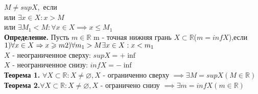 \documentclass[../main.tex]{subfiles}
\begin{document}
$M\neq supX,$ если\\ 
или $\exists x\in X: x> M$\\
или $\exists M_1 <M:\forall x \in X\implies x\leqslant M_1$\\
\textbf{\textbf{Определение.}} Пусть $m\in \mathbb{R}$ m - точная нижняя грань $X \subset \mathbb{R}$($m=infX$),если\\
$1)\forall x\in X \implies x\geqslant m\\
2)\forall m_1 > M\exists x \in X: x< m_1$\\
$X$ - неограниченное сверху: $supX = +\inf$\\
$X$ - неограниченное снизу: $infX =-\inf$\\ 
\textbf{Теорема 1.} $\forall X \subset \mathbb{R} : X \neq \varnothing, X$ - ограниченно сверху
$\implies \exists M = supX(M\in\mathbb{R})$\\
\textbf{Теорема 2.}$\forall X \subset \mathbb{R}: X\neq \varnothing, X$ - ограничено снизу
$\implies \exists m = infX(m\in\mathbb{R})$\newpage
\end{document}
